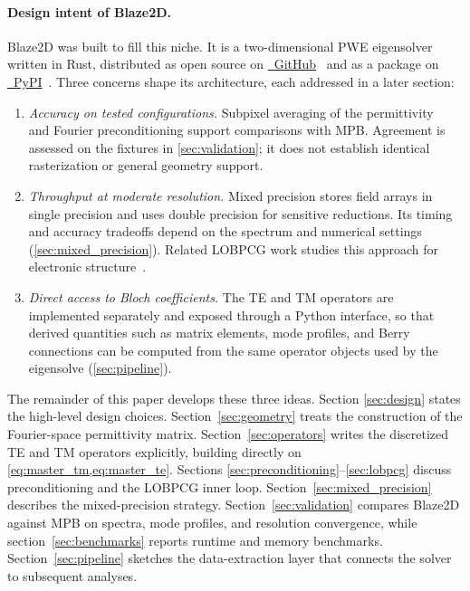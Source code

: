 \paragraph{Design intent of Blaze2D.}
Blaze2D was built to fill this niche. It is a two-dimensional PWE
eigensolver written in Rust, distributed as open source on
\href{https://github.com/RnLe/blaze2d}{~GitHub}~\cite{blaze2d_github}
and as a package on
\href{https://pypi.org/project/blaze2d/}{~PyPI}~\cite{blaze2d_pypi}.
Three concerns shape its architecture, each addressed in a later
section:
\begin{enumerate}
  \item \emph{Accuracy on tested configurations.} Subpixel averaging
        of the permittivity~\cite{farjadpour2006} and Fourier
        preconditioning support comparisons with MPB. Agreement is
        assessed on the fixtures in \cref{sec:validation}; it does not
        establish identical rasterization or general geometry support.
  \item \emph{Throughput at moderate resolution.} Mixed precision
        stores field arrays in single precision and uses double
        precision for sensitive reductions. Its timing and accuracy
        tradeoffs depend on the spectrum and numerical settings
        (\cref{sec:mixed_precision}). Related LOBPCG work studies this
        approach for electronic structure~\cite{woo2023}.
  \item \emph{Direct access to Bloch coefficients.} The TE and TM
        operators are implemented separately and exposed through a
        Python interface, so that derived quantities such as matrix
        elements, mode profiles, and Berry connections can be computed
        from the same operator objects used by the eigensolve
        (\cref{sec:pipeline}).
\end{enumerate}

The remainder of this paper develops these three ideas. Section
\ref{sec:design} states the high-level design choices.
Section~\ref{sec:geometry} treats the construction of the Fourier-space
permittivity matrix.
Section~\ref{sec:operators} writes the discretized TE and TM operators
explicitly, building directly on \cref{eq:master_tm,eq:master_te}.
Sections \ref{sec:preconditioning}--\ref{sec:lobpcg} discuss
preconditioning and the LOBPCG inner loop.
Section~\ref{sec:mixed_precision} describes the mixed-precision
strategy. Section~\ref{sec:validation} compares Blaze2D against MPB on
spectra, mode profiles, and resolution convergence, while
section~\ref{sec:benchmarks} reports runtime and memory benchmarks.
Section~\ref{sec:pipeline} sketches the data-extraction layer that
connects the solver to subsequent analyses.
